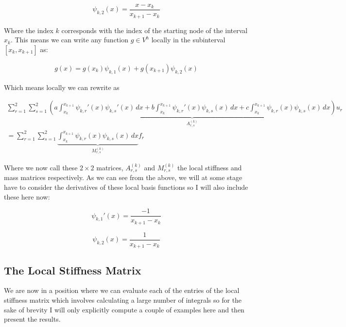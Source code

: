 \begin{equation}
	\psi_{k,2}(x) = \frac{x - x_k}{x_{k+1} - x_k}
\end{equation}

Where the index $k$ corresponds with the index of the starting node of the interval $x_k$.
This means we can write any function $g \in V^h$ locally in the subinterval $[x_k, x_{k+1}]$ as:

\begin{align*}
	g(x) = g(x_k)\psi_{k,1}(x) + g(x_{k+1})\psi_{k,2}(x)
\end{align*}

Which means locally we can rewrite  as

\begin{equation}\label{eq:oned-deterministic-local-discrete}
  \begin{split}
	\sum_{r = 1}^2\sum_{s = 1}^2\underbrace{\left(
          a\int_{x_k}^{x_{k+1}}\psi_{k,r}'(x)\psi_{k,s}'(x)\, dx
        + b\int_{x_k}^{x_{k+1}}\psi_{k,r}'(x)\psi_{k,s}(x)\, dx
        + c\int_{x_k}^{x_{k+1}}\psi_{k,r}(x)\psi_{k,s}(x)\, dx
    \right)}_{A^{(k)}_{r,s}}u_r  \\ 
    = \sum_{r= 1}^2\sum_{s = 1}^2\underbrace{
            \int_{x_k}^{x_{k+1}}{\psi_{k,r}(x)\psi_{k,s}(x)}\, dx}_{M^{(k)}_{r,s}}f_r
  \end{split}
\end{equation}

Where we now call these $2 \times 2$ matrices, $A^{(k)}_{r,s}$ and $M^{(k)}_{r,s}$ the local stiffness and
mass matrices respectively. As we can see from the above, we will at some stage have to consider the derivatives
of these local basis functions so I will also include these here now:

\begin{equation}
	\psi_{k,1}'(x) = \frac{-1}{x_{k+1} - x_{k}}
\end{equation}

\begin{equation}
	\psi_{k,2}(x) = \frac{1}{x_{k+1} - x_{k}}
\end{equation}

\subsection{The Local Stiffness Matrix}

We are now in a position where we can evaluate each of the entries of the local stiffness matrix which involves
calculating a large number of integrals so for the sake of brevity I will only explicitly compute a couple of 
examples here and then present the results.

